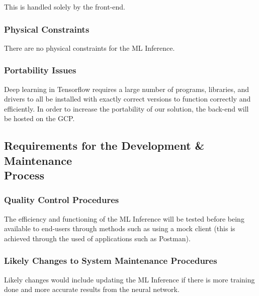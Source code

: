 \documentclass[12pt]{article}
\begin{document}
This is handled solely by the front-end.

\subsubsection {Physical Constraints}

There are no physical constraints for the ML Inference.

\subsubsection {Portability Issues}

Deep learning in Tensorflow requires a large number of programs, libraries, and drivers to all be installed with exactly correct versions to function correctly and efficiently. In order to increase the portability of our solution, the back-end will be hosted on the GCP.

\subsection{Requirements for the Development \& Maintenance\\ Process}

\subsubsection {Quality Control Procedures}

The efficiency and functioning of the ML Inference will be tested before being available to end-users through methods such as using a mock client (this is achieved through the used of applications such as Postman).

\subsubsection {Likely Changes to System Maintenance Procedures}

Likely changes would include updating the ML Inference if there is more training done and more accurate results from the neural network.
\end{document}
